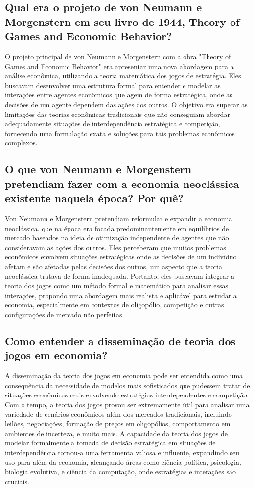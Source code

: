 \documentclass[a4paper,12pt]{article}[abntex2]
\begin{document}
\subsection{\textbf{Qual era o projeto de von Neumann e Morgenstern em seu livro de 1944, Theory of Games and Economic Behavior?}}
O projeto principal de von Neumann e Morgenstern com a obra "Theory of Games and Economic Behavior" era apresentar uma nova abordagem para a análise econômica, utilizando a teoria matemática dos jogos de estratégia. Eles buscavam desenvolver uma estrutura formal para entender e modelar as interações entre agentes econômicos que agem de forma estratégica, onde as decisões de um agente dependem das ações dos outros. O objetivo era superar as limitações das teorias econômicas tradicionais que não conseguiam abordar adequadamente situações de interdependência estratégica e competição, fornecendo uma formulação exata e soluções para tais problemas econômicos complexos.

\subsection{\textbf{O que von Neumann e Morgenstern pretendiam fazer com a economia neoclássica existente naquela época? Por quê?}}
Von Neumann e Morgenstern pretendiam reformular e expandir a economia neoclássica, que na época era focada predominantemente em equilíbrios de mercado baseados na ideia de otimização independente de agentes que não consideravam as ações dos outros. Eles perceberam que muitos problemas econômicos envolvem situações estratégicas onde as decisões de um indivíduo afetam e são afetadas pelas decisões dos outros, um aspecto que a teoria neoclássica tratava de forma inadequada. Portanto, eles buscavam integrar a teoria dos jogos como um método formal e matemático para analisar essas interações, propondo uma abordagem mais realista e aplicável para estudar a economia, especialmente em contextos de oligopólio, competição e outras configurações de mercado não perfeitas.

\subsection{\textbf{Como entender a disseminação de teoria dos jogos em economia?}}
A disseminação da teoria dos jogos em economia pode ser entendida como uma consequência da necessidade de modelos mais sofisticados que pudessem tratar de situações econômicas reais envolvendo estratégias interdependentes e competição. Com o tempo, a teoria dos jogos provou ser extremamente útil para analisar uma variedade de cenários econômicos além dos mercados tradicionais, incluindo leilões, negociações, formação de preços em oligopólios, comportamento em ambientes de incerteza, e muito mais. A capacidade da teoria dos jogos de modelar formalmente a tomada de decisão estratégica em situações de interdependência tornou-a uma ferramenta valiosa e influente, expandindo seu uso para além da economia, alcançando áreas como ciência política, psicologia, biologia evolutiva, e ciência da computação, onde estratégias e interações são cruciais.
\end{document}
